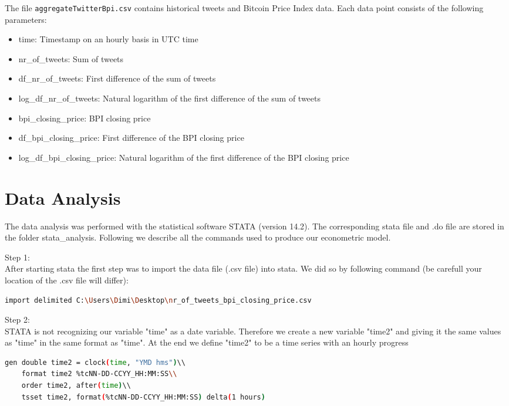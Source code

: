 \documentclass[a4paper,12pt]{article}
\begin{document}
\begin{spacing}{1.2}
The file \verb|aggregateTwitterBpi.csv| contains historical tweets and Bitcoin Price Index data. Each data point consists of the following parameters:
\begin{itemize}
    \item time: Timestamp on an hourly basis in UTC time
    \item {nr\_of\_tweets}: Sum of tweets
    \item {df\_nr\_of\_tweets}: First difference of the sum of tweets
    \item {log\_df\_nr\_of\_tweets}: Natural logarithm of the first difference of the sum of tweets
    \item {bpi\_closing\_price}: BPI closing price
    \item {df\_bpi\_closing\_price}: First difference of the BPI closing price
    \item {log\_df\_bpi\_closing\_price}: Natural logarithm of the first difference of the BPI closing price
\end{itemize}

\clearpage

\section{Data Analysis}
The data analysis was performed with the statistical software STATA (version 14.2). The corresponding stata file and .do file are stored in the folder stata\_analysis. Following we describe all the commands used to produce our econometric model.

Step 1:\\
After starting stata the first step was to import the data file (.csv file) into stata. We did so by following command (be carefull your location of the .csv file will differ):\\
\begin{lstlisting}[language=bash]
    import delimited C:\Users\Dimi\Desktop\nr_of_tweets_bpi_closing_price.csv
\end{lstlisting}

Step 2:\\
STATA is not recognizing our variable "time" as a date variable. Therefore we create a new variable "time2" and giving it the same values as "time" in the same format as "time". At the end we define "time2" to be a time series with an hourly progress\\
	\begin{lstlisting}[language=bash]
	gen double time2 = clock(time, "YMD hms")\\
	format time2 %tcNN-DD-CCYY_HH:MM:SS\\
	order time2, after(time)\\
	tsset time2, format(%tcNN-DD-CCYY_HH:MM:SS) delta(1 hours)
	\end{lstlisting}


\end{spacing}
\end{document}
